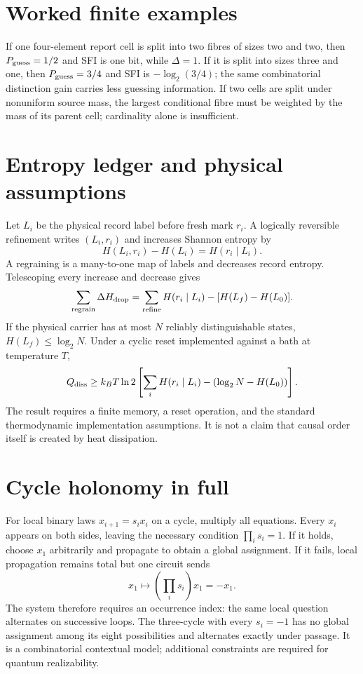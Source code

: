 \documentclass[11pt,a4paper]{article}
\begin{document}
\section{Worked finite examples}
If one four-element report cell is split into two fibres of sizes two and two, then $P_{\rm guess}=1/2$ and SFI is one bit, while $\Delta=1$. If it is split into sizes three and one, then $P_{\rm guess}=3/4$ and SFI is $-\log_2(3/4)$; the same combinatorial distinction gain carries less guessing information. If two cells are split under nonuniform source mass, the largest conditional fibre must be weighted by the mass of its parent cell; cardinality alone is insufficient.

\section{Entropy ledger and physical assumptions}
Let $L_i$ be the physical record label before fresh mark $r_i$. A logically reversible refinement writes $(L_i,r_i)$ and increases Shannon entropy by
\begin{equation}
H(L_i,r_i)-H(L_i)=H(r_i\mid L_i).
\end{equation}
A regraining is a many-to-one map of labels and decreases record entropy. Telescoping every increase and decrease gives
\begin{equation}
\sum_{\rm regrain}\Delta H_{\rm drop}
=\sum_{\rm refine}H(r_i\mid L_i)-[H(L_f)-H(L_0)].
\end{equation}
If the physical carrier has at most $N$ reliably distinguishable states, $H(L_f)\le\log_2N$. Under a cyclic reset implemented against a bath at temperature $T$,
\begin{equation}
Q_{\rm diss}\ge k_BT\ln2\left[
\sum_iH(r_i\mid L_i)-(\log_2N-H(L_0))
\right].
\end{equation}
The result requires a finite memory, a reset operation, and the standard thermodynamic implementation assumptions. It is not a claim that causal order itself is created by heat dissipation.

\section{Cycle holonomy in full}
For local binary laws $x_{i+1}=s_ix_i$ on a cycle, multiply all equations. Every $x_i$ appears on both sides, leaving the necessary condition $\prod_i s_i=1$. If it holds, choose $x_1$ arbitrarily and propagate to obtain a global assignment. If it fails, local propagation remains total but one circuit sends
\begin{equation}
x_1\longmapsto\left(\prod_i s_i\right)x_1=-x_1.
\end{equation}
The system therefore requires an occurrence index: the same local question alternates on successive loops. The three-cycle with every $s_i=-1$ has no global assignment among its eight possibilities and alternates exactly under passage. It is a combinatorial contextual model; additional constraints are required for quantum realizability.
\end{document}
